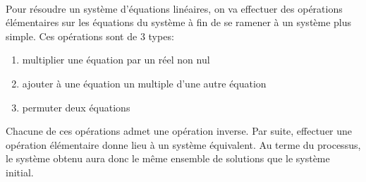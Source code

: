 \paragraph{} Pour résoudre un système d'équations linéaires, on va effectuer des opérations élémentaires sur les équations du système à fin de se ramener à un système plus simple. Ces opérations sont de 3 types:
\begin{enumerate}[ a)]
  \item multiplier une équation par un réel non nul
  \item ajouter à une équation un multiple d'une autre équation
  \item permuter deux équations
\end{enumerate}
Chacune de ces opérations admet une opération inverse. Par suite, effectuer une opération élémentaire donne lieu à un système équivalent. Au terme du processus, le système obtenu aura donc le même ensemble de solutions que le système initial.

